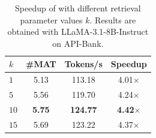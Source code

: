 \begin{table}[t]
\centering
\small
\begin{tabular}{@{}l|ccc@{}}
\toprule
\bf $k$ &\#MAT &Tokens/s & Speedup \\\midrule
$1$ & 5.13 & 113.18 & 4.01$\times$  \\
$5$ & 5.56 & 119.70 & 4.24$\times$ \\
$10$ & \bf{5.75} & \bf{124.77} & \bf{4.42$\times$} \\
$15$ & 5.69 & 123.22 & 4.37$\times$  \\
\bottomrule
\end{tabular}
\caption{Speedup of \method with different retrieval parameter values $k$. Results are obtained with LLaMA-3.1-8B-Instruct on API-Bank.}
\label{tab:topk}
\end{table}